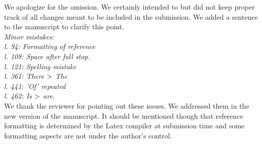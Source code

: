 \documentclass[12pt]{article}
\begin{document}
\noindent We apologize for the omission. We certainly intended to but did not keep proper track of all changes meant to be included in the submission. We added a sentence to the manuscript to clarify this point.\\

\noindent\textit{Minor mistakes:\\
l. 94: Formatting of reference\\
l. 108: Space after full stop.\\
l. 121: Spelling mistake\\
l. 361: There $\->$ The\\
l. 441: 'Of' repeated\\
l. 462: Is $\->$ are.} \\

\noindent We thank the reviewer for pointing out these issues. We addressed them in the new version of the manuscript. It should be mentioned though that reference formatting is determined by the Latex compiler at submission time and some formatting aspects are not under the author's control.\\






\end{document}
